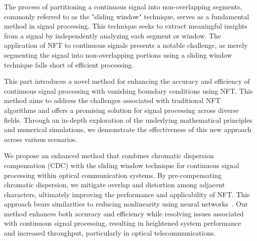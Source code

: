 The process of partitioning a continuous signal into non-overlapping segments, commonly referred to as the "sliding window" technique, serves as a fundamental method in signal processing. This technique seeks to extract meaningful insights from a signal by independently analyzing each segment or window.
The application of NFT to continuous signals presents a notable challenge, as merely segmenting the signal into non-overlapping portions using a sliding window technique falls short of efficient processing.

This part introduces a novel method for enhancing the accuracy and efficiency of continuous signal processing with vanishing boundary conditions using NFT. This method aims to address the challenges associated with traditional NFT algorithms and offers a promising solution for signal processing across diverse fields. Through an in-depth exploration of the underlying mathematical principles and numerical simulations, we demonstrate the effectiveness of this new approach across various scenarios.





We propose an enhanced method that combines chromatic dispersion compensation (CDC) with the sliding window technique for continuous signal processing within optical communication systems. By pre-compensating chromatic dispersion, we mitigate overlap and distortion among adjacent characters, ultimately improving the performance and applicability of NFT. This approach bears similarities to reducing nonlinearity using neural networks~\cite{9324921, 8535144, freire2021performance, zibar2015machine, cartledge2017digital}. Our method enhances both accuracy and efficiency while resolving issues associated with continuous signal processing, resulting in heightened system performance and increased throughput, particularly in optical telecommunications.